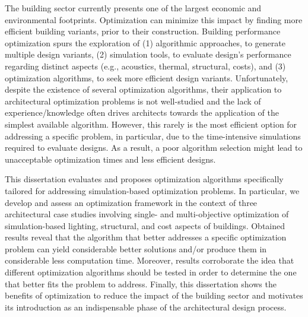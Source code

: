 \noindent 

The building sector currently presents one of the largest economic and environmental footprints. Optimization can minimize this impact by finding more efficient building variants, prior to their construction. Building performance optimization spurs the exploration of (1) algorithmic approaches, to generate multiple design variants, (2) simulation tools, to evaluate design's performance regarding distinct aspects (e.g., acoustics, thermal, structural, costs), and (3) optimization algorithms, to seek more efficient design variants. Unfortunately, despite the existence of several optimization algorithms, their application to architectural optimization problems is not well-studied and the lack of experience/knowledge often drives architects towards the application of the simplest available algorithm. However, this rarely is the most efficient option for addressing a specific problem, in particular, due to the time-intensive simulations required to evaluate designs. As a result, a poor algorithm selection might lead to unacceptable optimization times and less efficient designs. 

This dissertation evaluates and proposes optimization algorithms specifically tailored for addressing simulation-based optimization problems. In particular, we develop and assess an optimization framework in the context of three architectural case studies involving single- and multi-objective optimization of simulation-based lighting, structural, and cost aspects of buildings. Obtained results reveal that the algorithm that better addresses a specific optimization problem can yield considerable better solutions and/or produce them in considerable less computation time. Moreover, results corroborate the idea that different optimization algorithms should be tested in order to determine the one that better fits the problem to address. Finally, this dissertation shows the benefits of optimization to reduce the impact of the building sector and motivates its introduction as an indispensable phase of the architectural design process.

